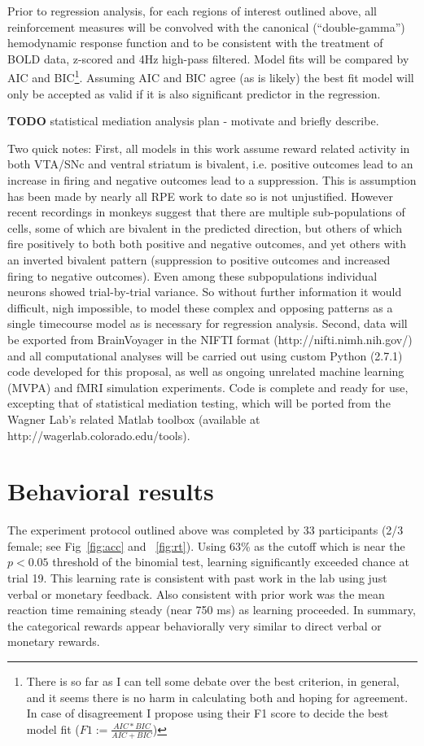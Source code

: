 \documentclass[doc,12pt]{apa}        %
\begin{document}
Prior to regression analysis, for each regions of interest outlined above, all reinforcement measures will be convolved with the canonical (``double-gamma'') hemodynamic response function and to be consistent with the treatment of BOLD data, z-scored and 4Hz high-pass filtered.  Model fits will be compared by AIC and BIC\footnote{There is so far as I can tell some debate over the best criterion, in general, and it seems there is no harm in calculating both and hoping for agreement.  In case of disagreement I propose using their F1 score to decide the best model fit ($F1 := \frac{AIC*BIC}{AIC+BIC}$) }. Assuming AIC and BIC agree (as is likely) the best fit model will only be accepted as valid if it is also significant predictor in the regression.

\textbf{TODO} statistical mediation analysis plan - motivate and briefly describe.

Two quick notes: First, all models in this work assume reward related activity in both VTA/SNc and ventral striatum is bivalent, i.e. positive outcomes lead to an increase in firing and negative outcomes lead to a suppression.  This is assumption has been made by nearly all RPE work to date so is not unjustified.  However recent recordings in monkeys suggest that there are multiple sub-populations of cells, some of which are bivalent in the predicted direction, but others of which fire positively to both both positive and negative outcomes, and yet others with an inverted bivalent pattern (suppression to positive  outcomes and increased firing to negative outcomes).  Even among these subpopulations individual neurons showed trial-by-trial variance.  So without further information it would difficult, nigh impossible, to model these complex and opposing patterns as a single timecourse model as is necessary for regression analysis.  Second, data will be exported from BrainVoyager in the NIFTI format (http://nifti.nimh.nih.gov/) and all computational analyses will be carried out using custom Python (2.7.1) code developed for this proposal, as well as ongoing unrelated machine learning (MVPA) and fMRI simulation experiments.  Code is complete and ready for use, excepting that of statistical mediation testing, which will be ported from the Wagner Lab's related Matlab toolbox (available at http://wagerlab.colorado.edu/tools).

\section{Behavioral results} %
\label{sec:behavioral_results}
The experiment protocol outlined above was completed by 33 participants (2/3 female; see Fig~\ref{fig:acc} and ~\ref{fig:rt}).  Using 63\% as the cutoff which is near the $p < 0.05$ threshold of the binomial test, learning significantly exceeded chance at trial 19.  This learning rate is consistent with past work in the lab using just verbal or monetary feedback.  Also consistent with prior work was the mean reaction time remaining steady (near 750 ms) as learning proceeded.  In summary, the categorical rewards appear behaviorally very similar to direct verbal or monetary rewards.
\end{document}
